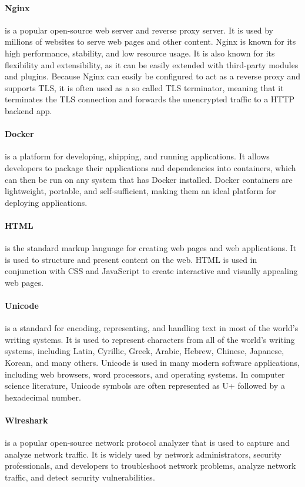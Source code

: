 \documentclass[12pt]{scrbook}
\begin{document}
\paragraph{Nginx} is a popular open-source web server and reverse proxy server. It is
used by millions of websites to serve web pages and other content. Nginx is
known for its high performance, stability, and low resource usage. It is also
known for its flexibility and extensibility, as it can be easily extended with
third-party modules and plugins. Because Nginx can easily be configured to act
as a reverse proxy and supports TLS, it is often used as a so called TLS
terminator, meaning that it terminates the TLS connection and forwards the
unencrypted traffic to a HTTP backend app.

\paragraph{Docker} is a platform for
developing, shipping, and running applications. It allows developers to package
their applications and dependencies into containers, which can then be run on
any system that has Docker installed. Docker containers are lightweight,
portable, and self-sufficient, making them an ideal platform for deploying
applications.

\paragraph{HTML} is the standard markup language for creating web pages
and web applications. It is used to structure and present content on the web.
HTML is used in conjunction with CSS and JavaScript to create interactive and
visually appealing web pages.

\paragraph{Unicode} is a standard for encoding,
representing, and handling text in most of the world's writing systems. It is
used to represent characters from all of the world's writing systems, including
Latin, Cyrillic, Greek, Arabic, Hebrew, Chinese, Japanese, Korean, and many
others. Unicode is used in many modern software applications, including web
browsers, word processors, and operating systems. In computer science
literature, Unicode symbols are often represented as U+ followed by a
hexadecimal number.

\paragraph{Wireshark} is a popular open-source network protocol
analyzer that is used to capture and analyze network traffic. It is widely used
by network administrators, security professionals, and developers to
troubleshoot network problems, analyze network traffic, and detect security
vulnerabilities.
\end{document}
